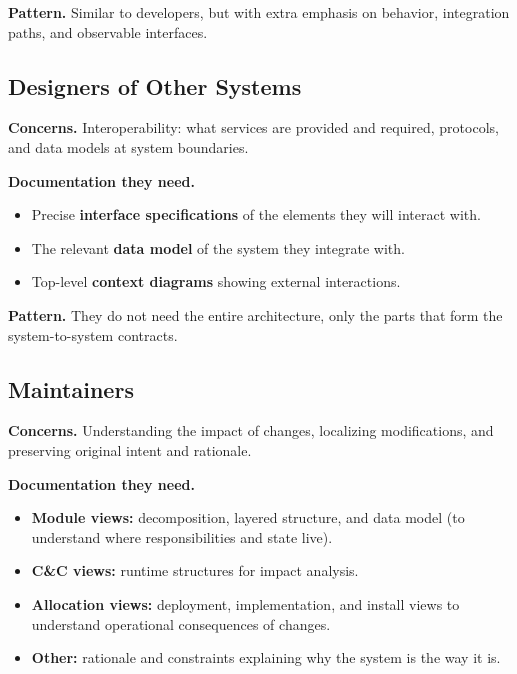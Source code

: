 \documentclass[11pt]{article}
\begin{document}
\noindent
\textbf{Pattern.} Similar to developers, but with extra emphasis on behavior, integration paths, and observable interfaces.

\subsection{Designers of Other Systems}

\textbf{Concerns.} Interoperability: what services are provided and required, protocols, and data models at system boundaries.

\medskip
\noindent
\textbf{Documentation they need.}
\begin{itemize}[noitemsep]
  \item Precise \textbf{interface specifications} of the elements they will interact with.
  \item The relevant \textbf{data model} of the system they integrate with.
  \item Top-level \textbf{context diagrams} showing external interactions.
\end{itemize}

\noindent
\textbf{Pattern.} They do not need the entire architecture, only the parts that form the system-to-system contracts.

\subsection{Maintainers}

\textbf{Concerns.} Understanding the impact of changes, localizing modifications, and preserving original intent and rationale.

\medskip
\noindent
\textbf{Documentation they need.}
\begin{itemize}[noitemsep]
  \item \textbf{Module views:} decomposition, layered structure, and data model (to understand where responsibilities and state live).
  \item \textbf{C\&C views:} runtime structures for impact analysis.
  \item \textbf{Allocation views:} deployment, implementation, and install views to understand operational consequences of changes.
  \item \textbf{Other:} rationale and constraints explaining why the system is the way it is.
\end{itemize}
\end{document}
